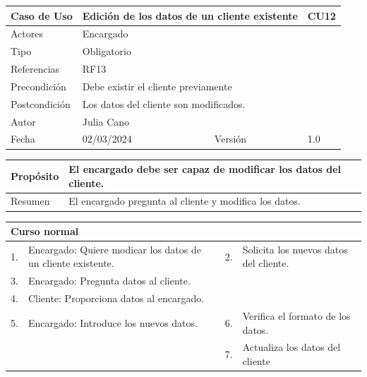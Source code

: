 \newpage


\begin{table}[H]
	\centering
	\begin{tabular}{| m{} | m{} | m{} | m{}|}
		\hline
		\rowcolor{grayshade} Caso de Uso & \multicolumn{2}{|m{0.43\textwidth}|}{Edición de los datos de un cliente existente} &  CU12\\ 
		\hline
		Actores & \multicolumn{3}{l|}{Encargado} \\ 
		\hline
		Tipo & \multicolumn{3}{l|}{Obligatorio} \\ 
		\hline
		Referencias & \multicolumn{3}{l|}{RF13} \\ 
		\hline
		Precondición & \multicolumn{3}{m{0.67\textwidth}|}{Debe existir el cliente previamente} \\ 
		\hline
		Postcondición & \multicolumn{3}{m{0.67\textwidth}|}{Los datos del cliente son modificados.} \\ 
		\hline
		Autor & \multicolumn{3}{l|}{Julia Cano} \\ 
		\hline
		Fecha & 02/03/2024 & Versión & 1.0 \\
		\hline
	\end{tabular}
\end{table}

\begin{table}[H]
	\centering
	\begin{tabular}{| m{} | m{} | m{} | m{} |}
		\hline
		Propósito & \multicolumn{3}{m{0.67\textwidth}|}{El encargado debe ser capaz de modificar los datos del cliente.}  \\ 
		\hline
		Resumen & \multicolumn{3}{m{0.67\textwidth}|}{El encargado pregunta al cliente y modifica los datos.} \\ 
		\hline
	\end{tabular}
\end{table}


\begin{table}[H]
	\centering
	\begin{tabular}{| m{} | m{} | m{} | m{} |}
		\hline
		\multicolumn{4}{|m{0.9\textwidth}|}{Curso normal}     \\ 
		\hline
		1. & Encargado: Quiere modicar los datos de un cliente existente. & 2. &  Solicita los nuevos datos del cliente.  \\ 
		\hline
		3. & Encargado: Pregunta datos al cliente. &  &   \\ 
		\hline
		4. & Cliente: Proporciona datos al encargado. &  &   \\ 
		\hline
		5. & Encargado: Introduce los nuevos datos. & 6. & Verifica el formato de los datos. \\ 
		\hline
		&  & 7. & Actualiza los datos del cliente \\ 
		\hline
	\end{tabular}
\end{table}

